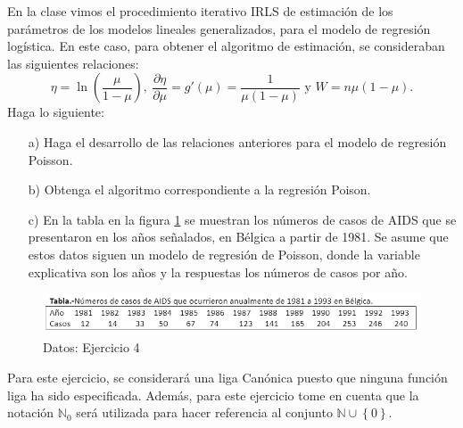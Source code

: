 \documentclass[10.5pt,notitlepage]{article}
\renewcommand{\qedsymbol}{$\blacksquare$}
\newcommand{\NN}{\mathbb{N}}
\newcommand{\kis}[1]{\left\{ #1 \right\}}
\newcommand{\pare}[1]{\left( #1 \right)}
\theoremstyle{plain}
\newenvironment{rem}
  {\pushQED{\qed}\renewcommand{\qedsymbol}{$\triangle$}\remarkex}
  {\popQED\endremarkex}
\begin{document}
\begin{exo}\label{Ej.4}
En la clase vimos el procedimiento iterativo IRLS de estimación de los parámetros de los modelos lineales generalizados, para el modelo de regresión logística.  En este caso, para obtener el algoritmo de estimación, se consideraban las siguientes relaciones: 
\begin{equation*}
    \eta = \ln\pare{\frac{\mu}{1 - \mu}}, \ \frac{\partial \eta}{\partial \mu} = g'(\mu) = \frac{1}{\mu(1 - \mu)} \text{ y } W = n\mu(1 - \mu). 
\end{equation*}
Haga lo siguiente:
\begin{itemize}
    \item[a)] Haga el desarrollo de las relaciones anteriores para el modelo de regresión Poisson.
    \item[b)] Obtenga el algoritmo correspondiente a la regresión Poison.
    \item[c)] En la tabla en la figura \ref{fig:my_label2} se muestran los números de casos de AIDS que se presentaron en los años señalados, en Bélgica a partir de 1981. Se asume que estos datos siguen un modelo de regresión de Poisson, donde la variable explicativa son los años y la respuestas los números de casos por año. 
\end{itemize}
\end{exo} 
\begin{figure}[htb]
    \centering
    \includegraphics[scale = 0.8]{Im2.png}
    \caption{Datos: Ejercicio 4}
    \label{fig:my_label2}
\end{figure}
\begin{rem}
Para este ejercicio, se considerará una liga Canónica puesto que ninguna función liga ha sido especificada. Además, para este ejercicio tome en cuenta que la notación \(\NN_0\) será utilizada para hacer referencia al conjunto \(\NN \cup \kis{0}.\)
\end{rem}
\end{document}

